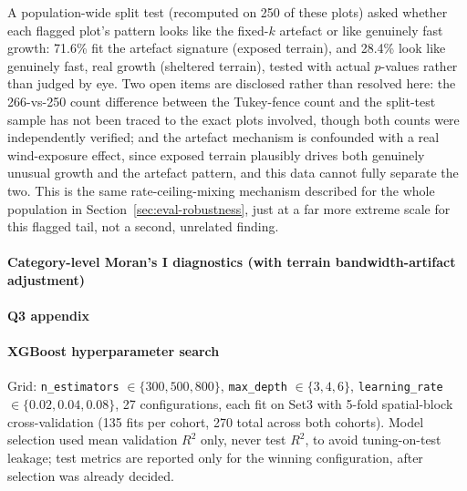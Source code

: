 A population-wide split test (recomputed on 250 of these plots) asked whether each flagged
plot's pattern looks like the fixed-$k$ artefact or like genuinely fast growth: 71.6\% fit the
artefact signature (exposed terrain), and 28.4\% look like genuinely fast, real growth
(sheltered terrain), tested with actual $p$-values rather than judged by eye. Two open items are
disclosed rather than resolved here: the 266-vs-250 count difference between the Tukey-fence
count and the split-test sample has not been traced to the exact plots involved, though both
counts were independently verified; and the artefact mechanism is confounded with a real
wind-exposure effect, since exposed terrain plausibly drives both genuinely unusual growth and
the artefact pattern, and this data cannot fully separate the two. This is the same
rate-ceiling-mixing mechanism described for the whole population in
Section~\ref{sec:eval-robustness}, just at a far more extreme scale for this flagged tail,
not a second, unrelated finding.

\paragraph*{Category-level Moran's I diagnostics (with terrain bandwidth-artifact adjustment)}
\label{app:results-q2-category-morans-i}

\paragraph*{Q3 appendix}
\label{app:results-q3}

\paragraph*{XGBoost hyperparameter search}
\label{app:hyperparameters}
Grid: \texttt{n\_estimators} $\in \{300, 500, 800\}$, \texttt{max\_depth} $\in \{3, 4, 6\}$,
\texttt{learning\_rate} $\in \{0.02, 0.04, 0.08\}$, 27 configurations, each fit on Set3 with
5-fold spatial-block cross-validation (135 fits per cohort, 270 total across both cohorts).
Model selection used mean validation $R^2$ only, never test $R^2$, to avoid tuning-on-test
leakage; test metrics are reported only for the winning configuration, after selection was
already decided.

